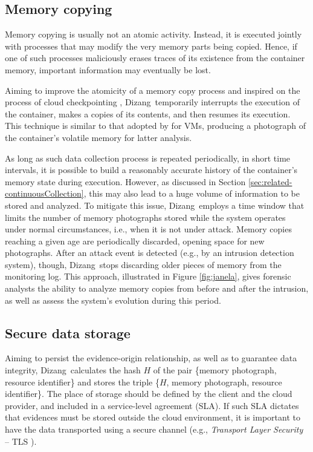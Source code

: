 \documentclass[twocolumn, notitlepage]{bmcart}%
\newcommand{\fancyname}{Dizang}
\begin{document}
\subsection*{Memory copying}
\label{sec:proposal-desc-memcpy}

Memory copying is usually not an atomic activity.
%
Instead, it is executed jointly with processes that may modify the very memory parts being copied.
%
Hence, if one of such processes maliciously erases traces of its existence from the container memory, important information may eventually be lost.


Aiming to improve the atomicity of a memory copy process and inspired on the process of cloud checkpointing \cite{cloud_checkpointing_2015}, 
%
\fancyname\ temporarily interrupts the execution of the container, makes a copies of its contents, and then resumes its execution. 
%
This technique is similar to that adopted by \cite{Rafique_Static_Live_Digital_Forensics:2013} for VMs, producing a photograph of the container's volatile memory for latter analysis.


As long as such data collection process is repeated periodically, in short time intervals, it is possible to build a reasonably accurate history of the container's memory state during execution.
%
However, as discussed in Section \ref{sec:related-continuousCollection}, this may also lead to a huge volume of information to be stored and analyzed.
%
To mitigate this issue, \fancyname\ employs a time window that limits the number of memory photographs stored while the system operates under normal circumstances, i.e., when it is not under attack.
%
Memory copies reaching a given age are periodically discarded, opening space for new photographs.
%
After an attack event is detected (e.g., by an intrusion detection system), though, \fancyname\ stops discarding older pieces of memory from the monitoring log.
%
This approach, illustrated in Figure \ref{fig:janela}, gives forensic analysts the ability to analyze memory copies from before and after the intrusion, as well as assess the system's evolution during this period.


\subsection*{Secure data storage}
\label{sec:proposal-sec-strg}


%
Aiming to persist the evidence-origin relationship, as well as to guarantee data integrity, \fancyname\ calculates the hash $H$ of the pair \{memory photograph, resource identifier\} and stores the triple \{$H$, memory photograph, resource identifier\}.
%
The place of storage should be defined by the client and the cloud provider, and included in a service-level agreement (SLA).
%
If such SLA dictates that evidences must be stored outside the cloud environment, it is important to have the data transported using a secure channel (e.g., \textit{Transport Layer Security} – TLS \cite{DierksT2008}).
\end{document}
